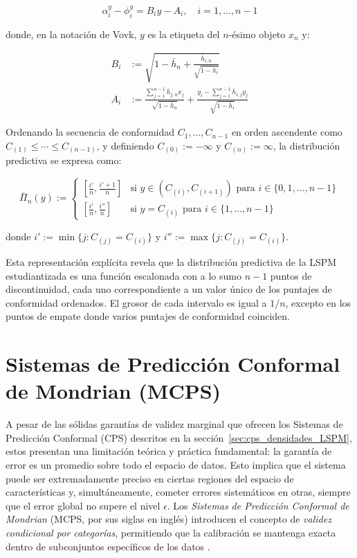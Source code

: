\begin{equation}
    \alpha_i^y - \phi_i^y = B_i y - A_i, \quad i = 1, \ldots, n-1
\end{equation}

donde, en la notación de Vovk, $y$ es la etiqueta del $n$-ésimo objeto $x_n$ y:

\begin{align}
    B_i &:= \sqrt{1 - \bar{h}_n + \frac{\bar{h}_{i,n}}{\sqrt{1 - \bar{h}_i}}} \\
    A_i &:= \frac{\sum_{j=1}^{n-1} \bar{h}_{j,n} x_j}{{\sqrt{1 - \bar{h}_n}}} + \frac{y_i - \sum_{j=1}^{n-1} \bar{h}_{i,j} y_j}{\sqrt{1 - \bar{h}_i}}
\end{align}

Ordenando la secuencia de conformidad $C_1, \ldots, C_{n-1}$ en orden ascendente como $C_{(1)} \leq \cdots \leq C_{(n-1)}$, y definiendo $C_{(0)} := -\infty$ y $C_{(n)} := \infty$, la distribución predictiva se expresa como:

\begin{equation}
    \bar{\Pi}_n(y) := 
    \begin{cases}
        \left[\frac{i'}{n}, \frac{i'+1}{n}\right] & \text{si } y \in (C_{(i)}, C_{(i+1)}) \text{ para } i \in \{0, 1, \ldots, n-1\} \\
        \left[\frac{i'}{n}, \frac{i''}{n}\right] & \text{si } y = C_{(i)} \text{ para } i \in \{1, \ldots, n-1\}
    \end{cases}
\end{equation}

donde $i' := \min\{j : C_{(j)} = C_{(i)}\}$ y $i'' := \max\{j : C_{(j)} = C_{(i)}\}$.

Esta representación explícita revela que la distribución predictiva de la LSPM estudiantizada es una función escalonada con a lo sumo $n-1$ puntos de discontinuidad, cada uno correspondiente a un valor único de los puntajes de conformidad ordenados. El grosor de cada intervalo es igual a $1/n$, excepto en los puntos de empate donde varios puntajes de conformidad coinciden.

\section{Sistemas de Predicción Conformal de Mondrian (MCPS)}
\label{sec:mcps_profundo}

A pesar de las sólidas garantías de validez marginal que ofrecen los Sistemas de Predicción Conformal (CPS) descritos en la sección~\ref{sec:cps_densidades_LSPM}, estos presentan una limitación teórica y práctica fundamental: la garantía de error es un promedio sobre todo el espacio de datos. Esto implica que el sistema puede ser extremadamente preciso en ciertas regiones del espacio de características y, simultáneamente, cometer errores sistemáticos en otras, siempre que el error global no supere el nivel $\epsilon$. Los \textit{Sistemas de Predicción Conformal de Mondrian} (MCPS, por sus siglas en inglés) introducen el concepto de \textit{validez condicional por categorías}, permitiendo que la calibración se mantenga exacta dentro de subconjuntos específicos de los datos \parencite{Vovk2022}.

